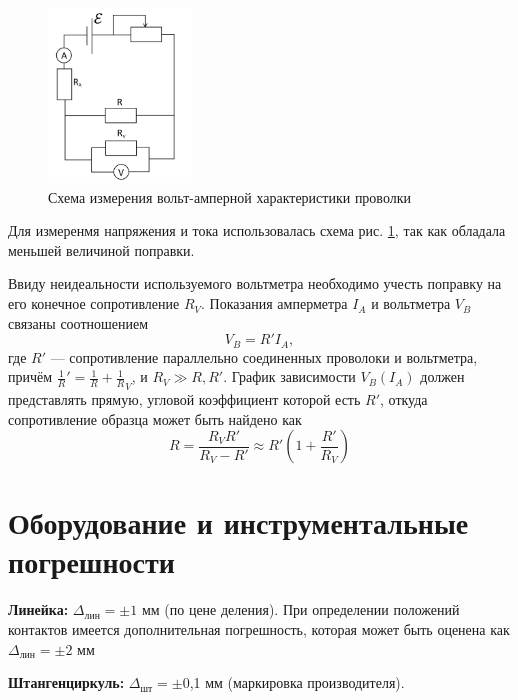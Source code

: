 \documentclass[12pt,a4paper]{article}
\begin{document}
\begin{figure}
\includegraphics[width=0.34\textwidth]{imgs/scheme.png}
\caption{Схема измерения вольт-амперной характеристики проволки}
\label{fig:scheme}
\end{figure}
Для измеренмя напряжения и тока использовалась схема рис. \ref{fig:scheme}, так как обладала меньшей величиной поправки.

Ввиду неидеальности используемого вольтметра необходимо
учесть поправку на его конечное сопротивление $R_V$.  Показания амперметра $I_A$ и вольтметра $V_B$ связаны соотношением
\begin{equation}\label{Vb_eq}
V_B = R'I_A,
\end{equation}
где $R'$ — сопротивление параллельно соединенных проволоки и
вольтметра, причём $\frac 1 R' = \frac 1 R + \frac 1 R_V$, и $R_V \gg R,R'$. График зависимости $V_B(I_A)$ должен представлять прямую, угловой коэффициент которой есть $R'$, откуда сопротивление образца может быть найдено как
\begin{equation} \label{R_eq}
R = \frac {R_V R'} {R_V-R'} \approx R'\left(1+\frac{R'}{R_V}\right)
\end{equation}

\section{ Оборудование и инструментальные погрешности}
{\bfseries Линейка:} $\Delta _{лин} = \pm 1$ мм (по цене деления). При определении положений контактов имеется дополнительная погрешность, которая может быть оценена как $\Delta _{лин} = \pm 2$ мм

{\bfseries Штангенциркуль:} $\Delta _{шт} = \pm$0,1 мм (маркировка производителя).
\end{document}
